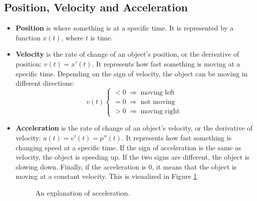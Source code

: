 \documentclass[12pt]{article}
\begin{document}
\subsection{Position, Velocity and Acceleration}
\begin{itemize}
	\item \textbf{Position} is where something is at a specific time. It is represented by a function $x(t)$, where $t$ is time.

	\item \textbf{Velocity} is the rate of change of an object's position, or the derivative of position: $v(t) = x'(t)$. It represents how fast something is moving at a specific time. Depending on the sign of velocity, the object can be moving in different directions:
	\[ v(t) \begin{cases}
		< 0 \; \Rightarrow \; \text{moving left} \\
		= 0 \; \Rightarrow \; \text{not moving} \\
		> 0 \; \Rightarrow \; \text{moving right}
	\end{cases} \]

	\item \textbf{Acceleration} is the rate of change of an object's velocity, or the derivative of velocity: $a(t) = v'(t) = p''(t)$. It represents how fast something is changing speed at a specific time. If the sign of acceleration is the same as velocity, the object is speeding up. If the two signs are different, the object is slowing down. Finally, if the acceleration is $0$, it means that the object is moving at a constant velocity. This is visualized in Figure \ref{fig:acceleration}.
	\begin{figure}[H]
		\begin{center}
			\caption{An explanation of acceleration.}
			\label{fig:acceleration}
		\end{center}
	\end{figure}
\end{itemize}
\end{document}
